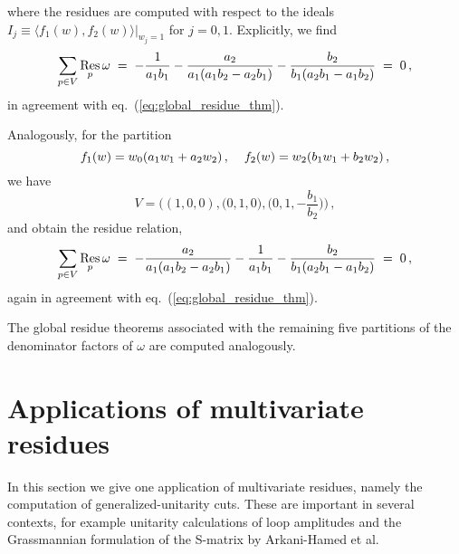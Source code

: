\documentclass[dvipsnames,preprint,12pt,sort&compress]{elsarticle}
\begin{document}
where the residues are computed with respect to the ideals
$I_j \equiv \big\langle f_1(w), f_2(w) \big\rangle\big|_{w_j = 1}$ for $j = 0,1$.
Explicitly, we find
\begin{align}
\sum_{p \in V} \mathop{\mathrm{Res}}_{p} \omega
\hspace{1mm}=\hspace{1mm} -\frac{1}{a_1 b_1} - \frac{a_2}{a_1 (a_1 b_2 - a_2 b_1)} - \frac{b_2}{b_1 (a_2 b_1 - a_1 b_2)}
\hspace{1mm}=\hspace{1mm} 0 \,,
\end{align}
in agreement with eq.~(\ref{eq:global_residue_thm}).

Analogously, for the partition
\begin{equation}
f_1(w) = w_0 (a_1 w_1 + a_2 w_2) \,, \hspace{4mm} f_2(w) = w_2 (b_1 w_1 + b_2 w_2) \,,
\end{equation}
we have
\begin{equation}
V = \Big( (1,0,0), \big(0,1,0\big), \big(0,1,-\textstyle{\frac{b_1}{b_2}}\big)\Big) \,,
\end{equation}
and obtain the residue relation,
\begin{align}
\sum_{p \in V} \mathop{\mathrm{Res}}_{p} \omega
\hspace{1mm}=\hspace{1mm} - \frac{a_2}{a_1 (a_1 b_2 - a_2 b_1)} -\frac{1}{a_1 b_1} - \frac{b_2}{b_1 (a_2 b_1 - a_1 b_2)}
\hspace{1mm}=\hspace{1mm} 0 \,,
\end{align}
again in agreement with eq.~(\ref{eq:global_residue_thm}).

The global residue theorems associated with the remaining five partitions
of the denominator factors of $\omega$ are computed analogously.


\section{Applications of multivariate residues}\label{sec:applications}

In this section we give one application of multivariate residues, namely
the computation of generalized-unitarity cuts. These are important in several contexts,
for example unitarity calculations of loop amplitudes and the Grassmannian
formulation of the S-matrix by Arkani-Hamed et al.
\end{document}
